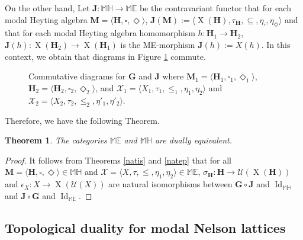 \documentclass[pdflatex,sn-mathphys-num]{sn-jnl}%
\newcommand{\He}{\mathbf{H}}
\newcommand{\MH}{\mathbb{MH}}
\newcommand{\Id}{\operatorname{Id}}
\newcommand{\X}[1]{\operatorname{X}(#1)}
\theoremstyle{thmstyleone}%
\newtheorem{theorem}{Theorem}%
\theoremstyle{thmstyletwo}%
\theoremstyle{thmstylethree}%
\begin{document}
On the other hand, Let $\mathbf{J}\colon \MH\to \mathbb{ME}$ be the contravariant functor that for each modal Heyting algebra $\mathbf{M}=\langle \He,\square,\Diamond\rangle$, $\mathbf{J}(\mathbf{M}):=\langle \X{\He},\tau_\He,\subseteq,\eta_\square,\eta_\Diamond\rangle$ and that for each modal Heyting algebra homomorphism $h\colon \He_1\to \He_2$, $\mathbf{J}(h)\colon \X{\He_2}\to \X{\He_1}$ is the ME-morphism $\mathbf{J}(h):=X(h)$. In this context, we obtain that diagrams in Figure \ref{fig3} commute.
    \begin{figure}[h]
    \centering
    \hspace{2cm}
   \caption{Commutative diagrams for $\mathbf{G}$ and $\mathbf{J}$ where $\mathbf{M}_1=\langle\He_1,\square_1,\Diamond_1\rangle$, $\mathbf{H}_2=\langle\He_2,\square_2,\Diamond_2\rangle$, and $\mathcal{X}_1=\langle X_1,\tau_1,\leq_1,\eta_1,\eta_2\rangle$ and $\mathcal{X}_2=\langle X_2,\tau_2,\leq_2,\eta'_1,\eta'_2\rangle$.}
    \label{fig3}
\end{figure} 

Therefore, we have the following Theorem.

\begin{theorem}
    The categories $\mathbb{ME}$ and $\MH$ are dually equivalent.
\end{theorem}
\begin{proof}
    It follows from Theorems \ref{natis} and \ref{natep} that for all $\mathbf{M}=\langle\He,\square,\Diamond\rangle\in\MH$ and $\mathcal{X}=\langle X,\tau,\leq,\eta_1,\eta_2\rangle\in \mathbb{ME}$, $\sigma_\He\colon \He\to \mathcal{U}(\X{\He})$ and $\epsilon_X\colon X\to \X{\mathcal{U}(X)}$ are natural isomorphisms between $\mathbf{G}\circ\mathbf{J}$ and $\Id_{\MH}$ and $\mathbf{J}\circ\mathbf{G}$ and $\Id_{\mathbb{ME}}$. 
\end{proof}

\subsection{Topological duality for modal Nelson lattices}
\end{document}
